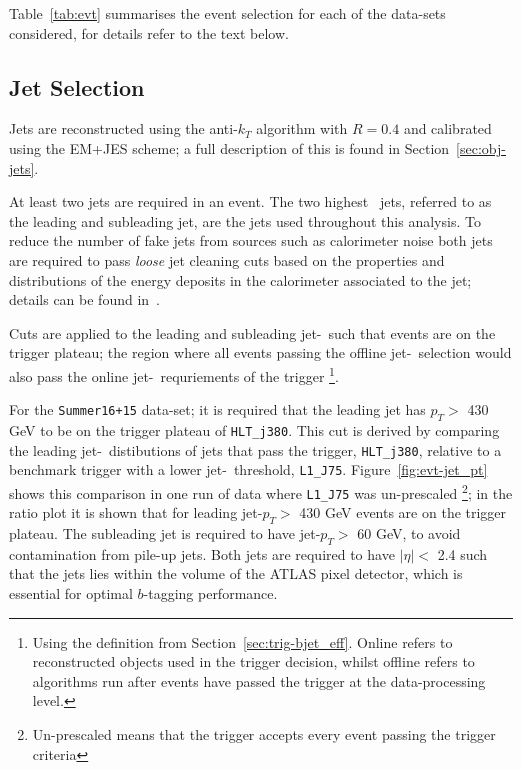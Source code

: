 Table~\ref{tab:evt} summarises the event selection for each of the
data-sets considered, for details refer to the text below.

\subsection{Jet Selection}
\label{sec:evt-sel-jets}

Jets are reconstructed using the anti-$k_T$ algorithm with $R=0.4$
and calibrated using the EM+JES scheme;
a full description of this is found in Section~\ref{sec:obj-jets}.

At least two jets are required in an event.
The two highest \pT~jets, referred to as the leading and subleading jet,
are the jets used throughout this analysis.
To reduce the number of fake jets from sources such as calorimeter noise
both jets are required to pass \textit{loose} jet cleaning cuts
based on the properties and distributions of the energy deposits in the calorimeter associated to the jet;
details can be found in~\cite{evt-jet_cleaning}.

Cuts are applied to the leading and subleading jet-\pT~such that events are on the trigger plateau;
the region where all events passing the offline jet-\pT~selection
would also pass the online jet-\pT~requriements of the trigger
\footnote{Using the definition from Section~\ref{sec:trig-bjet_eff}. Online refers to reconstructed objects used in the trigger decision,
  whilst offline refers to algorithms run after events have passed the trigger at the data-processing level. }.

For the \verb|Summer16+15| data-set; it is required that the leading jet has $p_T >$ 430 GeV to be on the trigger plateau of \verb|HLT_j380|.
This cut is derived by comparing the leading jet-\pT~distibutions of jets that pass the trigger, \verb|HLT_j380|,
relative to a benchmark trigger with a lower jet-\pT~threshold, \verb|L1_J75|.
Figure~\ref{fig:evt-jet_pt} shows this comparison in one run of data where \verb|L1_J75| was un-prescaled
\footnote{Un-prescaled means that the trigger accepts every event passing the trigger criteria};
in the ratio plot it is shown that for leading jet-$p_T >$ 430 GeV events are on the trigger plateau.
The subleading jet is required to have jet-$p_T >$ 60 GeV,
to avoid contamination from pile-up jets.
Both jets  are required to have $|\eta| <$ 2.4
such that the jets lies within the volume of the ATLAS pixel detector,
which is essential for optimal $b$-tagging performance.

